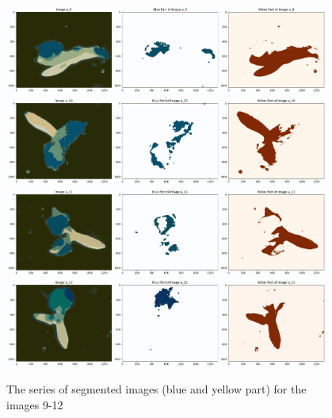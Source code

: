 \documentclass{article}
\begin{document}
\begin{figure}[h!]
\centering
\includegraphics[width=0.95\textwidth]{Report/Images/Appendix Images/ColorSegments/Image9.png}
\includegraphics[width=0.95\textwidth]{Report/Images/Appendix Images/ColorSegments/Image10.png}
\includegraphics[width=0.95\textwidth]{Report/Images/Appendix Images/ColorSegments/Image11.png}
\includegraphics[width=0.95\textwidth]{Report/Images/Appendix Images/ColorSegments/Image12.png}
\caption{The series of segmented images (blue and yellow part) for the images 9-12} 
\label{fig:segment9-12}
\end{figure}
\end{document}
